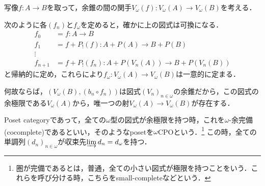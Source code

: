 \documentclass[uplatex, 12pt, dvipdfmx]{jsarticle}
\begin{document}
\begin{example}
    写像$f:A\to B$を取って，余錐の間の関手$V_\omega(f):V_\omega(A)\to V_\omega(B)$を考える．
    \begin{center}
    \end{center}
    次のように各$(f_n)$と$f_\omega$を定めると，確かに上の図式は可換になる．
    \begin{align*}
        f_0 &= f:A\to B \\
        f_1 &= f+P_!(f) : A+P(A) \to B+P(B) \\
        \vdots &{} \\
        f_{n+1} &= f+P_!(f_n) : A+P(V_n(A)) \to B+P(V_n(B))
    \end{align*}
    と帰納的に定め，これらにより$f_\omega:V_\omega(A)\to V_\omega(B)$は一意的に定まる．

    何故ならば，$(V_\omega(B),(b_n\circ f_n))$は図式$(V_n)_{n\in\omega}$の余錐だから，この図式の余極限である$V_\omega(A)$から，唯一つの射$V_\omega(A)\to V_\omega(B)$が存在する．
\end{example}

\begin{example}
    Poset categoryであって，全ての$\omega$型の図式が余極限を持つ時，これを$\omega$-余完備(cocomplete)であるといい，そのようなposetを$\omega$CPOという．\footnote{圏が完備であるとは，普通，全ての小さい図式が極限を持つことをいう．これらを呼び分ける時，こちらをsmall-completeなどという．}
    この時，全ての単調列$(d_n)_{n\in\omega}$が収束先$\varinjlim d_n=d_\omega$を持つ．
\end{example}
\end{document}
